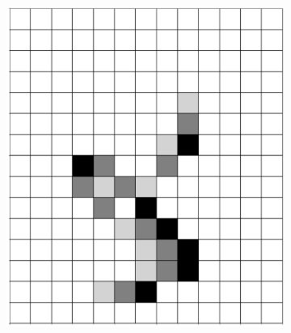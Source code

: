 \documentclass[12pt]{article}
\numberwithin{figure}{section} %
\begin{document}
\begin{figure}[H]
\begin{subfigure}{0.22\textwidth}
     		\subcaption{}
   	\end{subfigure}
    	\begin{subfigure}{0.22\textwidth}
     		\includegraphics[width=\linewidth]{Section4/36.3}
     		\subcaption{}
   	\end{subfigure}
	\newline
	\begin{subfigure}[t]{0.06\textwidth}
		\centering
		\phantom{H}
  	\end{subfigure}	
	\begin{subfigure}{0.22\textwidth}

\end{subfigure}
\end{figure}
\end{document}
